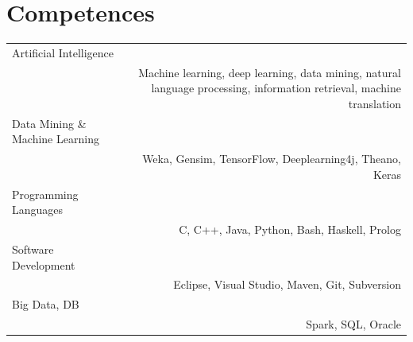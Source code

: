 \documentclass[10pt]{article}
\begin{document}
\section*{Competences}
\begin{tabular}{L!{\VRule}R}
Artificial Intelligence\\&Machine learning, deep learning, data mining, natural language processing, information retrieval, machine translation\\
Data Mining \& Machine Learning\\&Weka, Gensim, TensorFlow, Deeplearning4j, Theano, Keras\\
Programming Languages\\&C, C++, Java, Python, Bash, Haskell, Prolog\\
Software Development\\&Eclipse, Visual Studio, Maven, Git, Subversion\\
Big Data, DB\\& Spark, SQL, Oracle\\
\end{tabular}
\end{document}

